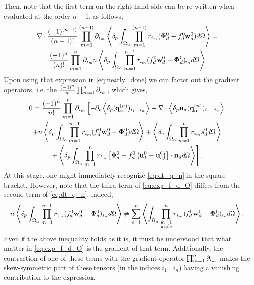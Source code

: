 Then, note that the first term on the right-hand side can be re-written when evaluated at the order $n-1$, as follows,
\begin{multline*}
    \div \expo[{(n-1)}]{(\bm\Phi_d^0 - f_d^0 \textbf{w}_d^0)}
    = \\
    \frac{(-1)^{n}}{{(n)}!} \partialp{1}{n}  n \pOavg{ \pri{1}{n-1}(f_d^0 \textbf{w}_d^0 - \bm\Phi_d^0)_{i_{n}} }
\end{multline*} 
Upon using that expression in \ref{eq:nearly_done} we can factor out the gradient operators, i.e. the $\frac{(-1)^n}{n!} \partialp{1}{n}$, which gives, 
\begin{multline}
    0 = \frac{(-1)^n}{n!}
    \partialp{1}{n}
    \left[
        - \partial_t
        \pavg{(\textbf{q}_\alpha^{(n)})_{i_1\ldots i_n}}
        - \div \pavg{\textbf{u}_\alpha (\textbf{q}_\alpha^{(n)})_{i_1\ldots i_n}}
    \right.\\\left.
        +n\pavg{\int_{\Omega_\alpha} \pri{1}{n-1} (f_d^0 \textbf{w}_d^0-\bm\Phi_d^0) d\Omega}
        +\pavg{\int_{\Omega_\alpha} \pri{1}{n} s_d^0 d\Omega}
        \right.\\\left.
        +\pavg{\int_{\Omega_\alpha} \pri{1}{n} \left[
            \bm\Phi_d^0
            + f_d^0
            \left(
                \textbf{u}_I^0
                - \textbf{u}_d^0
            \right)
        \right]
        \cdot \textbf{n}_d d\Omega}
    \right].
    \label{eq:exp_f_d_O}
\end{multline}
At this stage, one might immediately recognize \ref{eq:dt_q_n} in the square bracket. 
However, note that the third term of \ref{eq:exp_f_d_O} differs from the second term of \ref{eq:dt_q_n}. 
Indeed, 
\begin{equation}
    n\pavg{\int_{\Omega_\alpha} \pri{1}{n-1} ( f_d^0 \textbf{w}_d^0-\bm\Phi_d^0)_{i_n} d\Omega}
    \neq
    \sum_{e=1}^{n} 
    \avg{
        \intO{
        \prod^{n}_{\substack{ m=1 \\m \neq e}} r_{i_m} (f_d^0 \textbf{w}_d^0  - \bm\Phi_d^0)_{i_e}
        }
    }. 
    \label{eq:ineq_which_does_not_make_sens}
\end{equation}
Even if the above inequality holds as it is, it must be understood that what matter in \ref{eq:exp_f_d_O} is the gradient of that term. 
Additionally, the contraction of one of these terms with the gradient operator $\partialp{1}{n}$ makes the skew-symmetric part of these tensors (in the indices $i_1\ldots i_n$) having a vanishing contribution to the expression.
